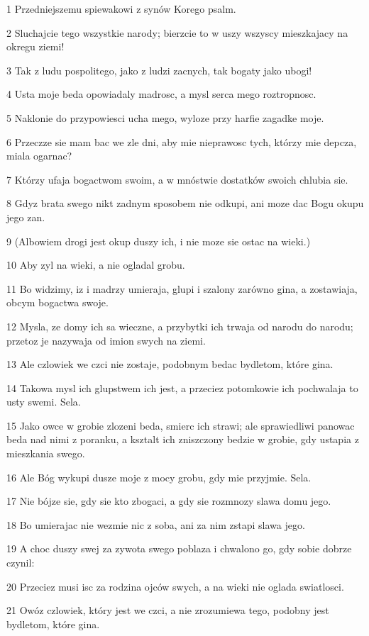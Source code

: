 \par 1 Przedniejszemu spiewakowi z synów Korego psalm.
\par 2 Sluchajcie tego wszystkie narody; bierzcie to w uszy wszyscy mieszkajacy na okregu ziemi!
\par 3 Tak z ludu pospolitego, jako z ludzi zacnych, tak bogaty jako ubogi!
\par 4 Usta moje beda opowiadaly madrosc, a mysl serca mego roztropnosc.
\par 5 Naklonie do przypowiesci ucha mego, wyloze przy harfie zagadke moje.
\par 6 Przeczze sie mam bac we zle dni, aby mie nieprawosc tych, którzy mie depcza, miala ogarnac?
\par 7 Którzy ufaja bogactwom swoim, a w mnóstwie dostatków swoich chlubia sie.
\par 8 Gdyz brata swego nikt zadnym sposobem nie odkupi, ani moze dac Bogu okupu jego zan.
\par 9 (Albowiem drogi jest okup duszy ich, i nie moze sie ostac na wieki.)
\par 10 Aby zyl na wieki, a nie ogladal grobu.
\par 11 Bo widzimy, iz i madrzy umieraja, glupi i szalony zarówno gina, a zostawiaja, obcym bogactwa swoje.
\par 12 Mysla, ze domy ich sa wieczne, a przybytki ich trwaja od narodu do narodu; przetoz je nazywaja od imion swych na ziemi.
\par 13 Ale czlowiek we czci nie zostaje, podobnym bedac bydletom, które gina.
\par 14 Takowa mysl ich glupstwem ich jest, a przeciez potomkowie ich pochwalaja to usty swemi. Sela.
\par 15 Jako owce w grobie zlozeni beda, smierc ich strawi; ale sprawiedliwi panowac beda nad nimi z poranku, a ksztalt ich zniszczony bedzie w grobie, gdy ustapia z mieszkania swego.
\par 16 Ale Bóg wykupi dusze moje z mocy grobu, gdy mie przyjmie. Sela.
\par 17 Nie bójze sie, gdy sie kto zbogaci, a gdy sie rozmnozy slawa domu jego.
\par 18 Bo umierajac nie wezmie nic z soba, ani za nim zstapi slawa jego.
\par 19 A choc duszy swej za zywota swego poblaza i chwalono go, gdy sobie dobrze czynil:
\par 20 Przeciez musi isc za rodzina ojców swych, a na wieki nie oglada swiatlosci.
\par 21 Owóz czlowiek, który jest we czci, a nie zrozumiewa tego, podobny jest bydletom, które gina.

